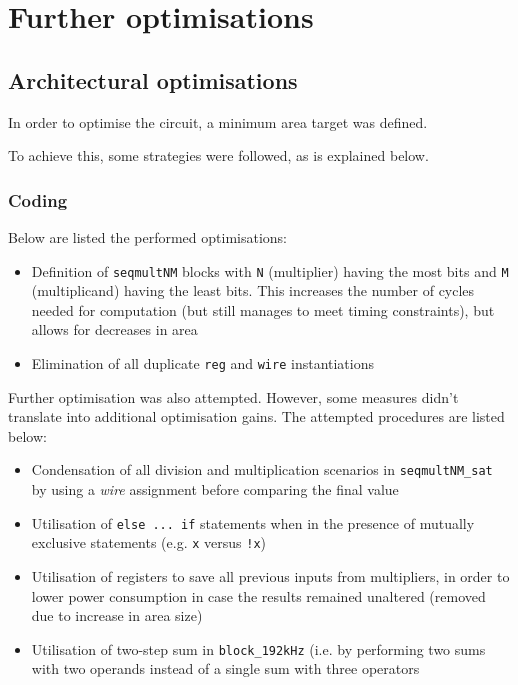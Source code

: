 \section{Further optimisations}\label{sec:further-optimisations}

\subsection{Architectural optimisations}

In order to optimise the circuit, a minimum area target was defined.

To achieve this, some strategies were followed, as is explained below.

\subsubsection*{Coding}

Below are listed the performed optimisations:
\begin{itemize}
	\item Definition of \texttt{seqmultNM} blocks with \texttt{N} (multiplier) having the most bits and \texttt{M} (multiplicand) having the least bits. This increases the number of cycles needed for computation (but still manages to meet timing constraints), but allows for decreases in area
	\item Elimination of all duplicate \texttt{reg} and \texttt{wire} instantiations
\end{itemize}

Further optimisation was also attempted. However, some measures didn't translate into additional optimisation gains. The attempted procedures are listed below:
\begin{itemize}
	\item Condensation of all division and multiplication scenarios in \texttt{seqmultNM\_sat} by using a \emph{wire} assignment before comparing the final value
	\item Utilisation of \texttt{else ... if} statements when in the presence of mutually exclusive statements (e.g. \texttt{x} versus \texttt{!x})
	\item Utilisation of registers to save all previous inputs from multipliers, in order to lower power consumption in case the results remained unaltered (removed due to increase in area size)
	\item Utilisation of two-step sum in \texttt{block\_192kHz} (i.e. by performing two sums with two operands instead of a single sum with three operators
\end{itemize}

